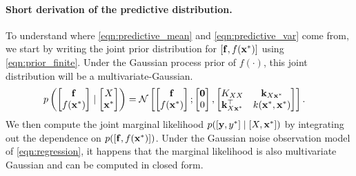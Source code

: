 \paragraph{Short derivation of the predictive distribution.}
To understand where \autoref{eqn:predictive_mean} and \autoref{eqn:predictive_var} come from, we start by writing the joint prior distribution for $[\mathbf{f}, f(\mathbf{x}^*)]$ using \autoref{eqn:prior_finite}.
Under the Gaussian process prior of $f(\cdot)$, this joint distribution will be a multivariate-Gaussian.
%
\begin{align*}
  p \left(
    \begin{bmatrix} \mathbf{f} \\ f(\mathbf{x}^*) \end{bmatrix} \mid
    \begin{bmatrix} X \\ \mathbf{x}^* \end{bmatrix}
  \right)
  &= \mathcal{N} \left[ 
    \begin{bmatrix} \mathbf{f} \\ f(\mathbf{x}^*) \end{bmatrix} ;
    \begin{bmatrix} \mathbf{0} \\ 0 \end{bmatrix}
  , 
    \begin{bmatrix}
      K_{X X}    & \mathbf{k}_{X \mathbf{x}^*} \\
      \mathbf{k}_{X \mathbf{x}^*}^\top   & k(\mathbf{x}^*, \mathbf{x}^*)
    \end{bmatrix}
   \right].
\end{align*}
%
We then compute the joint marginal likelihood $p( [ \mathbf{y}, y^* ] \mid [ X, \mathbf{x}^* ] )$ by integrating out the dependence on $p( [\mathbf{f}, f(\mathbf{x}^*)] )$.
Under the Gaussian noise observation model of \autoref{eqn:regression}, it happens that the marginal likelihood is also multivariate Gaussian and can be computed in closed form.
%
